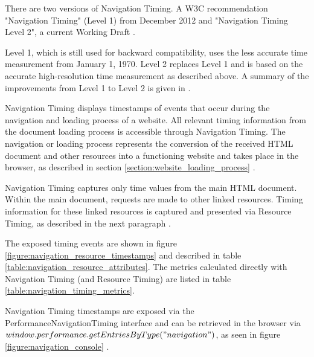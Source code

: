 
There are two versions of Navigation Timing.
A W3C recommendation "Navigation Timing" (Level 1) from December 2012 \cite{2012W3CNavigationTiming}
and "Navigation Timing Level 2", a current Working Draft \cite{2021W3CNavigationTimingLevel2}.

Level 1, which is still used for backward compatibility, uses the less accurate time measurement from January 1, 1970.
Level 2 replaces Level 1 and is based on the accurate high-resolution time measurement as described above.
A summary of the improvements from Level 1 to Level 2 is given in \cite{2021W3CNavigationTimingLevel2}.




Navigation Timing displays timestamps of events that occur during the navigation and loading process of a website.
All relevant timing information from the document loading process is accessible through Navigation Timing.
The navigation or loading process represents the conversion of the received HTML document and other resources into a functioning website and takes place in the browser, as described in section \ref{section:website_loading_process} \cite{2020W3CPrimer}.

Navigation Timing captures only time values from the main HTML document.
Within the main document, requests are made to other linked resources.
Timing information for these linked resources is captured and presented via Resource Timing, as described in the next paragraph \cite{2021MDNNavigationAndResourceTimings}.

The exposed timing events are shown in figure \ref{figure:navigation_resource_timestamps} and described in table \ref{table:navigation_resource_attributes}.
The metrics calculated directly with Navigation Timing (and Resource Timing) are listed in table \ref{table:navigation_timing_metrics}.


Navigation Timing timestamps are exposed via the PerformanceNavigationTiming interface and can be retrieved in the browser via $window.performance.getEntriesByType("navigation")$, as seen in figure \ref{figure:navigation_console} \cite{2021W3CNavigationTimingLevel2}.


